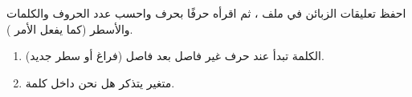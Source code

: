 \begin{statement}
احفظ تعليقات الزبائن في ملف ، ثم اقرأه حرفًا بحرف واحسب عدد الحروف والكلمات والأسطر (كما يفعل الأمر ).
\end{statement}
\begin{stepsbox}\begin{enumerate}
\item الكلمة تبدأ عند حرف غير فاصل بعد فاصل (فراغ أو سطر جديد).
\item متغير  يتذكر هل نحن داخل كلمة.
\end{enumerate}\end{stepsbox}
